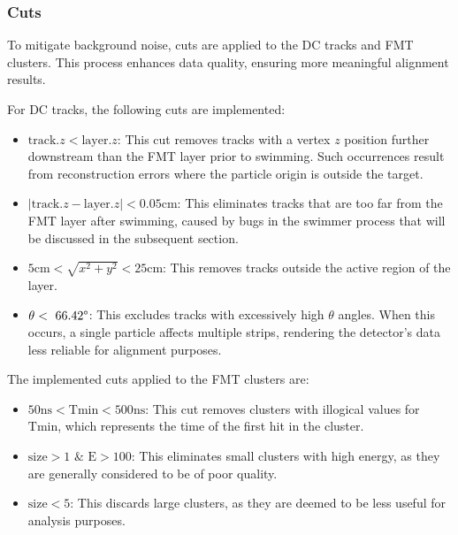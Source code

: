 \subsubsection{Cuts}
\label{12.21::cuts}
    To mitigate background noise, cuts are applied to the DC tracks and FMT clusters.
    This process enhances data quality, ensuring more meaningful alignment results.

    For DC tracks, the following cuts are implemented:
    \begin{itemize}
        \item
            $\text{track}.z < \text{layer}.z$:
            This cut removes tracks with a vertex $z$ position further downstream than the FMT layer prior to swimming.
            Such occurrences result from reconstruction errors where the particle origin is outside the target.
        \item
            $\mid\text{track}.z - \text{layer}.z\mid < 0.05 \text{cm}$:
            This eliminates tracks that are too far from the FMT layer after swimming, caused by bugs in the swimmer process that will be discussed in the subsequent section.
        \item
            $5 \text{cm} < \sqrt{x^2 + y^2} < 25 \text{cm}$:
            This removes tracks outside the active region of the layer.
        \item
            $\theta < ~66.42\degree$:
            This excludes tracks with excessively high $\theta$ angles.
            When this occurs, a single particle affects multiple strips, rendering the detector's data less reliable for alignment purposes.
    \end{itemize}

    The implemented cuts applied to the FMT clusters are:
    \begin{itemize}
        \item
            $50 \text{ns} < \text{T}{\text{min}} < 500 \text{ns}$:
            This cut removes clusters with illogical values for $\text{T}{\text{min}}$, which represents the time of the first hit in the cluster.
        \item
            $\text{size} > 1$ $\&$ $\text{E} > 100$:
            This eliminates small clusters with high energy, as they are generally considered to be of poor quality.
        \item
            $\text{size} < 5$:
            This discards large clusters, as they are deemed to be less useful for analysis purposes.
    \end{itemize}
